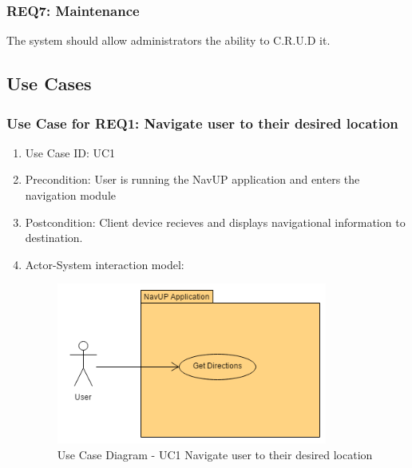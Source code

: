 \documentclass[11pt, a4paper]{article}
\begin{document}
		\subsubsection{REQ7: Maintenance}
			The system should allow administrators the ability to C.R.U.D it.
			
	\newpage
	\subsection{Use Cases}
		\subsubsection{Use Case for REQ1: Navigate user to their desired location}
			\begin{enumerate}
			\renewcommand{\labelenumi}{{\textbf{\arabic{enumi}.}}}
			\item Use Case ID: UC1
			\item Precondition: User is running the NavUP application and enters the navigation module
			\item Postcondition: Client device recieves and displays navigational information to destination.
			\item Actor-System interaction model:
				\graphicspath{ {./Images/User/} }
				\begin{figure}[h]
				\caption{Use Case Diagram -  UC1 Navigate user to their desired location}
				\includegraphics[height = 200px]{GetDesiredLocation.png}
				\end{figure}
			\end{enumerate}
\end{document}
